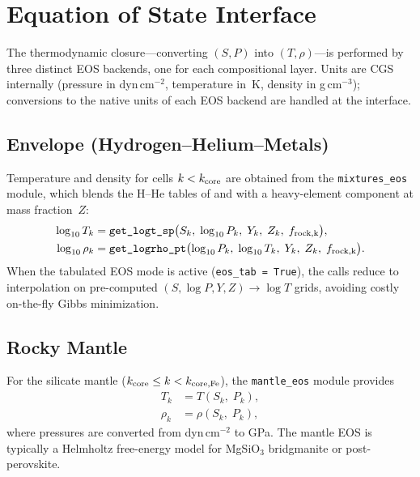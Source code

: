 \documentclass{aastex631}
\begin{document}
\section{Equation of State Interface}\label{sec:eos}

The thermodynamic closure---converting $(S, P)$ into $(T, \rho)$---is
performed by three distinct EOS backends, one for each compositional
layer.  Units are CGS internally (pressure in dyn\,cm$^{-2}$,
temperature in~K, density in g\,cm$^{-3}$); conversions to the native
units of each EOS backend are handled at the interface.

\subsection{Envelope (Hydrogen--Helium--Metals)}

Temperature and density for cells $k < k_{\rm core}$ are obtained from
the \texttt{mixtures\_eos} module, which blends the H--He tables of
\citet{Becker2018} and \citet{French2019} with a heavy-element
component at mass fraction~$Z$:
\begin{align}
  \log_{10} T_k &= \texttt{get\_logt\_sp}
    \bigl(S_k,\;\log_{10}P_k,\;Y_k,\;Z_k,\;f_{\rm rock,k}\bigr),
  \label{eq:eos_env_T}
\\
  \log_{10}\rho_k &= \texttt{get\_logrho\_pt}
    \bigl(\log_{10}P_k,\;\log_{10}T_k,\;Y_k,\;Z_k,\;f_{\rm rock,k}\bigr).
  \label{eq:eos_env_rho}
\end{align}
When the tabulated EOS mode is active (\texttt{eos\_tab = True}), the
calls reduce to interpolation on pre-computed
$(S, \log P, Y, Z) \to \log T$ grids, avoiding costly on-the-fly
Gibbs minimization.

\subsection{Rocky Mantle}

For the silicate mantle ($k_{\rm core} \le k < k_{\rm core,Fe}$), the
\texttt{mantle\_eos} module provides
\begin{align}
  T_k &= T(S_k,\;P_k), \label{eq:eos_mantle_T} \\
  \rho_k &= \rho(S_k,\;P_k), \label{eq:eos_mantle_rho}
\end{align}
where pressures are converted from dyn\,cm$^{-2}$ to GPa.  The mantle
EOS is typically a Helmholtz free-energy model for MgSiO$_3$ bridgmanite
or post-perovskite.
\end{document}
